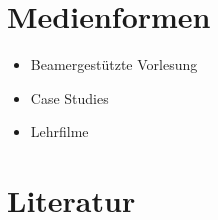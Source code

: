 \hypertarget{medienformenpathlabelmi-2017modulbeschreibungen-bachelorba_mensch-computer_interaktion}{%
\section*{Medienformen\label{/mi-2017/modulbeschreibungen-bachelor/BA_Mensch-Computer_Interaktion}}\label{medienformenpathlabelmi-2017modulbeschreibungen-bachelorba_mensch-computer_interaktion}}

\begin{itemize}
\tightlist
\item
  Beamergestützte Vorlesung
\item
  Case Studies
\item
  Lehrfilme
\end{itemize}

\hypertarget{literaturpathlabelmi-2017modulbeschreibungen-bachelorba_mensch-computer_interaktion}{%
\section*{Literatur\label{/mi-2017/modulbeschreibungen-bachelor/BA_Mensch-Computer_Interaktion}}\label{literaturpathlabelmi-2017modulbeschreibungen-bachelorba_mensch-computer_interaktion}}

